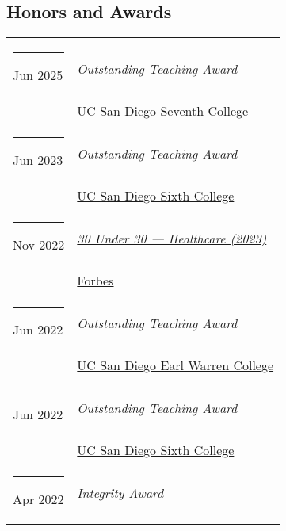\documentclass[margin,line]{res}
\begin{document}
\begin{resume}
\section{\sc Honors and Awards}
\begin{longtable}{@{}p{0.7in}p{4in}}
\hspace*{-4mm} \rule{-1mm}{5mm} Jun 2025 & \textit{Outstanding Teaching Award}\\*
\hspace*{-4mm} \hspace*{-4mm} & \hspace{4mm} \href{https://seventh.ucsd.edu/}{UC San Diego Seventh College}\\
\hspace*{-4mm} \rule{-1mm}{5mm} Jun 2023 & \textit{Outstanding Teaching Award}\\*
\hspace*{-4mm} \hspace*{-4mm} & \hspace{4mm} \href{https://sixth.ucsd.edu/}{UC San Diego Sixth College}\\
\hspace*{-4mm} \rule{-1mm}{5mm} Nov 2022 & \href{https://www.forbes.com/profile/niema-moshiri}{\textit{30 Under 30 --- Healthcare (2023)}}\\*
\hspace*{-4mm} \hspace*{-4mm} & \hspace{4mm} \href{https://www.forbes.com/30-under-30/2023/healthcare/}{Forbes}\\
\hspace*{-4mm} \rule{-1mm}{5mm} Jun 2022 & \textit{Outstanding Teaching Award}\\*
\hspace*{-4mm} \hspace*{-4mm} & \hspace{4mm} \href{https://warren.ucsd.edu/}{UC San Diego Earl Warren College}\\
\hspace*{-4mm} \rule{-1mm}{5mm} Jun 2022 & \textit{Outstanding Teaching Award}\\*
\hspace*{-4mm} \hspace*{-4mm} & \hspace{4mm} \href{https://sixth.ucsd.edu/}{UC San Diego Sixth College}\\
\hspace*{-4mm} \rule{-1mm}{5mm} Apr 2022 & \href{https://academicintegrity.ucsd.edu/events/integrity-awards/index.html}{\textit{Integrity Award}}\\*

\end{longtable}
\end{resume}
\end{document}
